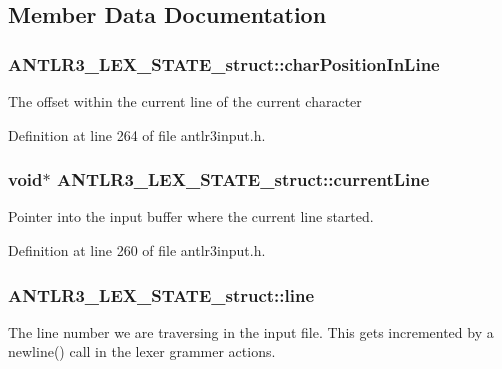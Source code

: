 \subsection{Member Data Documentation}
\hypertarget{struct_a_n_t_l_r3___l_e_x___s_t_a_t_e__struct_a73739086ab0955aa12c5e9d1242df682}{
\subsubsection[{char\-Position\-In\-Line}]{ A\-N\-T\-L\-R3\-\_\-\-L\-E\-X\-\_\-\-S\-T\-A\-T\-E\-\_\-struct\-::char\-Position\-In\-Line}}\label{struct_a_n_t_l_r3___l_e_x___s_t_a_t_e__struct_a73739086ab0955aa12c5e9d1242df682}
The offset within the current line of the current character 

Definition at line 264 of file antlr3input.\-h.

\hypertarget{struct_a_n_t_l_r3___l_e_x___s_t_a_t_e__struct_a02f3890c40ac5408967b59943261c90c}{
\subsubsection[{current\-Line}]{\setlength{\rightskip}{0pt plus 5cm}void$\ast$ A\-N\-T\-L\-R3\-\_\-\-L\-E\-X\-\_\-\-S\-T\-A\-T\-E\-\_\-struct\-::current\-Line}}\label{struct_a_n_t_l_r3___l_e_x___s_t_a_t_e__struct_a02f3890c40ac5408967b59943261c90c}
Pointer into the input buffer where the current line started. 

Definition at line 260 of file antlr3input.\-h.

\hypertarget{struct_a_n_t_l_r3___l_e_x___s_t_a_t_e__struct_a00999851e4d46ac4cd60e3be5c0bac13}{
\subsubsection[{line}]{ A\-N\-T\-L\-R3\-\_\-\-L\-E\-X\-\_\-\-S\-T\-A\-T\-E\-\_\-struct\-::line}}\label{struct_a_n_t_l_r3___l_e_x___s_t_a_t_e__struct_a00999851e4d46ac4cd60e3be5c0bac13}
The line number we are traversing in the input file. This gets incremented by a newline() call in the lexer grammer actions. 

